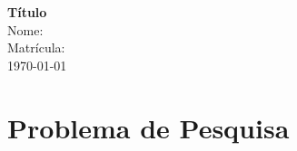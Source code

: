 \documentclass[12pt,a4paper, brazil]{article}
\begin{document}
\begin{center}
{\textbf {\huge Título}}\\[5mm]
{\large Nome: } \\[2mm]
{\large Matrícula: } \\[5mm]
\today\\[5mm] %
\end{center}



\section{Problema de Pesquisa}

\cite{salahdine2019social}
\textcite{salahdine2019social}

\printbibliography
\end{document}
